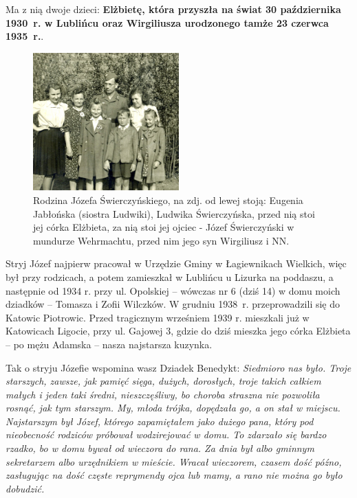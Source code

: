 Ma z nią dwoje dzieci: \textbf{Elżbietę, która przyszła na świat 30 października 1930~r. w Lublińcu oraz Wirgiliusza urodzonego tamże 23 czerwca 1935~r.}.

\begin{figure}[!h]
\begin{center}
\includegraphics[width=0.5\textwidth]{photo/jozef_swierczynski.jpg}
\caption[Rodzina Józefa Świerczyńskiego]{Rodzina Józefa Świerczyńskiego, na zdj. od lewej stoją: Eugenia Jabłońska (siostra Ludwiki), Ludwika Świerczyńska, przed nią stoi jej córka Elżbieta, za nią stoi jej ojciec - Józef Świerczyński w mundurze Wehrmachtu, przed nim jego syn Wirgiliusz i NN.}
\label{rys:jozef_swierczynski.jpg}
\end{center}
\end{figure}

Stryj Józef najpierw pracował w Urzędzie Gminy w Łagiewnikach Wielkich, więc był przy rodzicach, a potem zamieszkał w Lublińcu u Lizurka na poddaszu, a następnie od 1934 r. przy ul. Opolskiej -- wówczas nr 6 (dziś 14) w domu moich dziadków -- Tomasza i Zofii Wilczków. W grudniu 1938~r. przeprowadzili się do Katowic Piotrowic. Przed tragicznym wrześniem 1939 r. mieszkali już w Katowicach Ligocie, przy ul. Gajowej 3, gdzie do dziś mieszka jego córka Elżbieta -- po mężu Adamska -- nasza najstarsza kuzynka.

Tak o stryju Józefie wspomina wasz Dziadek Benedykt: \textit{Siedmioro nas było. Troje starszych, zawsze, jak pamięć sięga, dużych, dorosłych, troje takich całkiem małych i jeden taki średni, nieszczęśliwy, bo choroba straszna nie pozwoliła rosnąć, jak tym starszym. My, młoda trójka, dopędzała go, a on stał w miejscu. Najstarszym był Józef, którego zapamiętałem jako dużego pana, który pod nieobecność rodziców próbował wodzirejować w domu. To zdarzało się bardzo rzadko, bo w domu bywał od wieczora do rana. Za dnia był albo gminnym sekretarzem albo urzędnikiem w mieście. Wracał wieczorem, czasem dość późno, zasługując na dość częste reprymendy ojca lub mamy, a rano nie można go było dobudzić.}

